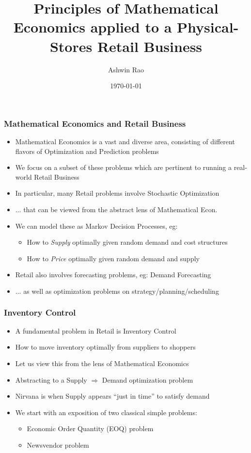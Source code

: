 \documentclass[handout]{beamer}
\title[Mathematical Economics for Retail]{Principles of Mathematical Economics applied to a Physical-Stores Retail Business} %
\author{Ashwin Rao} %
\institute[Stanford] %
{
ICME, Stanford University
}
\date{\today} %
\begin{document}
\begin{frame}
\titlepage %
\end{frame}


\begin{frame}
\frametitle{Mathematical Economics and Retail Business}
\pause
\begin{itemize}[<+->]
\item Mathematical Economics is a vast and diverse area, consisting of different flavors of Optimization and Prediction problems
\item We focus on a subset of these problems which are pertinent to running a real-world Retail Business
\item In particular, many Retail problems involve Stochastic Optimization
\item ... that can be viewed from the abstract lens of Mathematical Econ.
\item We can model these as Markov Decision Processes, eg:
\begin{itemize}
\item How to {\em Supply} optimally given random demand and cost structures
\item How to {\em Price} optimally given random demand and supply
\end{itemize}
\item Retail also involves forecasting problems, eg: Demand Forecasting
\item ... as well as optimization problems on strategy/planning/scheduling
\end{itemize}
\end{frame}

\begin{frame}
\frametitle{Inventory Control}
\pause
\begin{itemize}[<+->]
\item A fundamental problem in Retail is Inventory Control
\item How to move inventory optimally from suppliers to shoppers
\item Let us view this from the lens of Mathematical Economics
\item Abstracting to a Supply $\Rightarrow$ Demand optimization problem
\item Nirvana is when Supply appears ``just in time'' to satisfy demand
\item We start with an exposition of two classical simple problems:
\begin{itemize}
\item Economic Order Quantity (EOQ) problem
\item Newsvendor problem
\end{itemize}
\end{itemize}
\end{frame}
\end{document}

